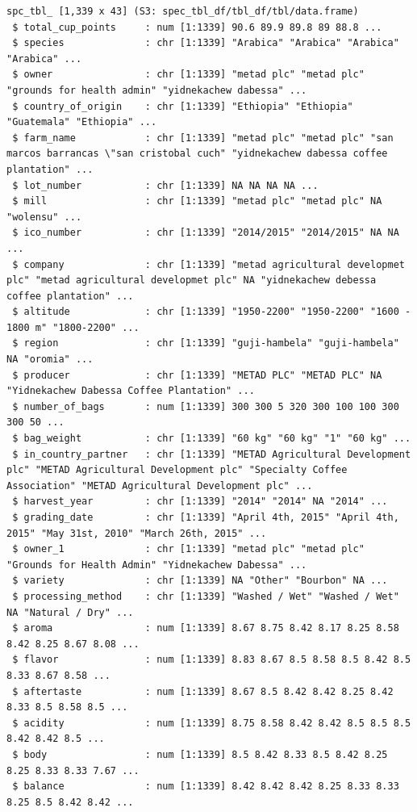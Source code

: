 \documentclass[
  letterpaper,
]{book}
\begin{document}
\begin{verbatim}
spc_tbl_ [1,339 x 43] (S3: spec_tbl_df/tbl_df/tbl/data.frame)
 $ total_cup_points     : num [1:1339] 90.6 89.9 89.8 89 88.8 ...
 $ species              : chr [1:1339] "Arabica" "Arabica" "Arabica" "Arabica" ...
 $ owner                : chr [1:1339] "metad plc" "metad plc" "grounds for health admin" "yidnekachew dabessa" ...
 $ country_of_origin    : chr [1:1339] "Ethiopia" "Ethiopia" "Guatemala" "Ethiopia" ...
 $ farm_name            : chr [1:1339] "metad plc" "metad plc" "san marcos barrancas \"san cristobal cuch" "yidnekachew dabessa coffee plantation" ...
 $ lot_number           : chr [1:1339] NA NA NA NA ...
 $ mill                 : chr [1:1339] "metad plc" "metad plc" NA "wolensu" ...
 $ ico_number           : chr [1:1339] "2014/2015" "2014/2015" NA NA ...
 $ company              : chr [1:1339] "metad agricultural developmet plc" "metad agricultural developmet plc" NA "yidnekachew debessa coffee plantation" ...
 $ altitude             : chr [1:1339] "1950-2200" "1950-2200" "1600 - 1800 m" "1800-2200" ...
 $ region               : chr [1:1339] "guji-hambela" "guji-hambela" NA "oromia" ...
 $ producer             : chr [1:1339] "METAD PLC" "METAD PLC" NA "Yidnekachew Dabessa Coffee Plantation" ...
 $ number_of_bags       : num [1:1339] 300 300 5 320 300 100 100 300 300 50 ...
 $ bag_weight           : chr [1:1339] "60 kg" "60 kg" "1" "60 kg" ...
 $ in_country_partner   : chr [1:1339] "METAD Agricultural Development plc" "METAD Agricultural Development plc" "Specialty Coffee Association" "METAD Agricultural Development plc" ...
 $ harvest_year         : chr [1:1339] "2014" "2014" NA "2014" ...
 $ grading_date         : chr [1:1339] "April 4th, 2015" "April 4th, 2015" "May 31st, 2010" "March 26th, 2015" ...
 $ owner_1              : chr [1:1339] "metad plc" "metad plc" "Grounds for Health Admin" "Yidnekachew Dabessa" ...
 $ variety              : chr [1:1339] NA "Other" "Bourbon" NA ...
 $ processing_method    : chr [1:1339] "Washed / Wet" "Washed / Wet" NA "Natural / Dry" ...
 $ aroma                : num [1:1339] 8.67 8.75 8.42 8.17 8.25 8.58 8.42 8.25 8.67 8.08 ...
 $ flavor               : num [1:1339] 8.83 8.67 8.5 8.58 8.5 8.42 8.5 8.33 8.67 8.58 ...
 $ aftertaste           : num [1:1339] 8.67 8.5 8.42 8.42 8.25 8.42 8.33 8.5 8.58 8.5 ...
 $ acidity              : num [1:1339] 8.75 8.58 8.42 8.42 8.5 8.5 8.5 8.42 8.42 8.5 ...
 $ body                 : num [1:1339] 8.5 8.42 8.33 8.5 8.42 8.25 8.25 8.33 8.33 7.67 ...
 $ balance              : num [1:1339] 8.42 8.42 8.42 8.25 8.33 8.33 8.25 8.5 8.42 8.42 ...

\end{verbatim}
\end{document}
